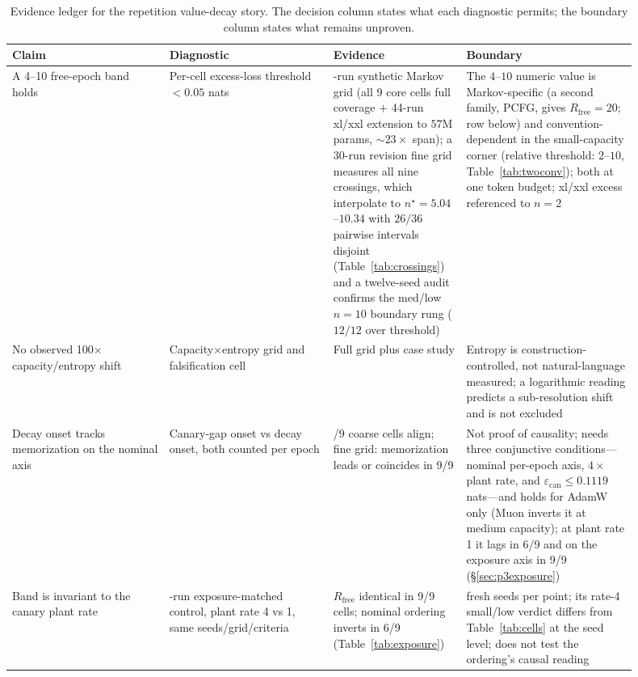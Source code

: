 \documentclass[11pt]{article}
\begin{document}
\begin{table}[htbp]
\centering
\caption{Evidence ledger for the repetition value-decay story. The decision column
states what each diagnostic permits; the boundary column states what remains unproven.}
\label{tab:evidence-ledger}
\scriptsize
\begin{tabular}{@{}>{\raggedright\arraybackslash}p{0.23\linewidth}>{\raggedright\arraybackslash}p{0.24\linewidth}>{\raggedright\arraybackslash}p{0.18\linewidth}>{\raggedright\arraybackslash}p{0.25\linewidth}@{}}
\toprule
Claim & Diagnostic & Evidence & Boundary \\
\midrule
A 4--10 free-epoch band holds & Per-cell excess-loss threshold $<0.05$ nats & 218-run synthetic Markov grid (all 9 core cells full coverage $+$ 44-run xl/xxl extension to $57$M params, ${\sim}23\times$ span); a 30-run revision fine grid measures all nine crossings, which interpolate to $n^\star = 5.04$--$10.34$ with $26/36$ pairwise intervals disjoint (Table~\ref{tab:crossings}) and a twelve-seed audit confirms the med/low $n{=}10$ boundary rung ($12/12$ over threshold) & The $4$--$10$ numeric value is Markov-specific (a second family, PCFG, gives $R_{\mathrm{free}}=20$; row below) and convention-dependent in the small-capacity corner (relative threshold: $2$--$10$, Table~\ref{tab:twoconv}); both at one token budget; xl/xxl excess referenced to $n{=}2$ \\
No observed 100$\times$ capacity/entropy shift & Capacity$\times$entropy grid and falsification cell & Full grid plus case study & Entropy is construction-controlled, not natural-language measured; a logarithmic reading predicts a sub-resolution shift and is not excluded \\
Decay onset tracks memorization on the nominal axis & Canary-gap onset vs decay onset, both counted per epoch & 8/9 coarse cells align; fine grid: memorization leads or coincides in 9/9 & Not proof of causality; needs three conjunctive conditions---nominal per-epoch axis, $4\times$ plant rate, and $\varepsilon_{\mathrm{can}}\leq0.1119$ nats---and holds for AdamW only (Muon inverts it at medium capacity); at plant rate 1 it lags in 6/9 and on the exposure axis in 9/9 (\S\ref{sec:p3exposure}) \\
Band is invariant to the canary plant rate & 324-run exposure-matched control, plant rate 4 vs 1, same seeds/grid/criteria & $R_{\mathrm{free}}$ identical in 9/9 cells; nominal ordering inverts in 6/9 (Table~\ref{tab:exposure}) & 3 fresh seeds per point; its rate-4 small/low verdict differs from Table~\ref{tab:cells} at the seed level; does not test the ordering's causal reading \\

\end{tabular}
\end{table}
\end{document}
